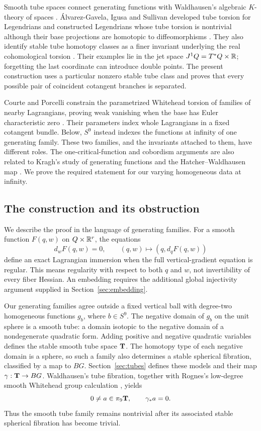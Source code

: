 Smooth tube spaces connect generating functions with Waldhausen's
algebraic $K$-theory of spaces \cite{Waldhausen1982,WJR2013}.
\mbox{\'{A}lvarez-Gavela}, Igusa and Sullivan developed tube torsion for
Legendrians and constructed Legendrians whose tube torsion is nontrivial
although their base projections are homotopic to diffeomorphisms
\cite[Theorem~1.15]{AIS2026}. They also identify stable tube homotopy
classes as a finer invariant underlying the real cohomological torsion
\cite[Remark~3.32]{AIS2026}. Their examples lie in the jet space
$J^1Q=T^*Q\times\mathbb R$; forgetting the last coordinate can introduce double
points. The present construction uses a particular nonzero stable tube
class and proves that every possible pair of coincident cotangent
branches is separated.

Courte and Porcelli constrain the parametrized Whitehead torsion of
families of nearby Lagrangians, proving weak vanishing when the base has
Euler characteristic zero \cite[Theorems~1.2 and~1.5, Corollary~1.6]{CP2025}.
Their parameters index whole Lagrangians in a fixed cotangent bundle.
Below, $S^9$ instead indexes the functions at infinity of one generating
family. These two families, and the invariants attached to them, have
different roles. The one-critical-function and cobordism arguments are
also related to Kragh's study of generating functions and the
Hatcher--Waldhausen map \cite{Kragh2026}. We prove the required statement
for our varying homogeneous data at infinity.

\subsection{The construction and its obstruction}

We describe the proof in the language of generating families. For a
smooth function $F(q,w)$ on $Q\times\mathbb R^r$, the equations
\[
 d_wF(q,w)=0,\qquad (q,w)\longmapsto(q,d_qF(q,w))
\]
define an exact Lagrangian immersion when the full vertical-gradient
equation is regular. This means regularity with respect to both $q$ and
$w$, not invertibility of every fiber Hessian. An embedding requires the
additional global injectivity argument supplied in
Section~\ref{sec:embedding}.

Our generating families agree outside a fixed vertical ball with
degree-two homogeneous functions $g_b$, where $b\in S^9$. The negative
domain of $g_b$ on the unit sphere is a smooth tube: a domain isotopic
to the negative domain of a nondegenerate quadratic form. Adding positive and
negative quadratic variables defines the stable smooth tube space $\mathbf T$.
The homotopy type of each negative domain is a sphere, so such a family
also determines a stable spherical fibration, classified by a map to
$BG$. Section~\ref{sec:tubes} defines these models and their map
$\gamma:\mathbf T\to BG$. Waldhausen's tube fibration, together with Rognes's
low-degree smooth Whitehead group calculation
\cite{Waldhausen1982,Rognes2002,Rognes2014}, yields
\[
 0\ne a\in\pi_9\mathbf T,\qquad \gamma_*a=0.
\]
Thus the smooth tube family remains nontrivial after its associated
stable spherical fibration has become trivial.

